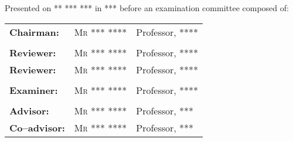 \begin{titlepage}
\begin{center}
        Presented on ** *** *** in *** before an examination committee composed of:\\
    \end{center}
    \begin{center}
        \begin{tabular}{lll}
            \textbf{Chairman:}   & \textsc{Mr *** ****} & Professor, \textsc{****}
            \tabularnewline
            \tabularnewline
            \textbf{Reviewer:}    & \textsc{Mr *** ****} & Professor, \textsc{****}
            \tabularnewline
            \textbf{Reviewer:}    & \textsc{Mr *** ****} & Professor, \textsc{****}
            \tabularnewline
            \tabularnewline
            \textbf{Examiner:}    & \textsc{Mr *** ****} & Professor, \textsc{****}
            \tabularnewline
            \tabularnewline
            \textbf{Advisor:}     & \textsc{Mr *** ****} & Professor, \textsc{***}
            \tabularnewline
            \textbf{Co--advisor:} & \textsc{Mr *** ****} & Professor, \textsc{***}
        \end{tabular}
    \end{center}
    \sloppy
\end{titlepage}
